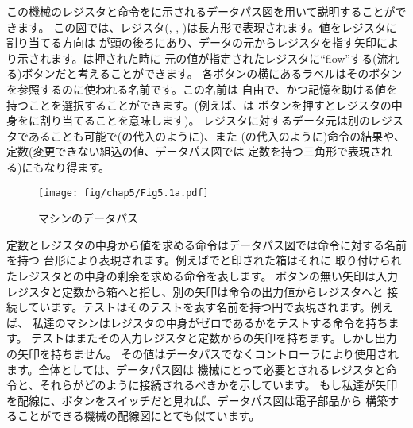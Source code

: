 この機械のレジスタと命令をに示されるデータパス図を用いて説明することができます。
この図では、レジスタ(, , )は長方形で表現されます。値をレジスタに割り当てる方向は
が頭の後ろにあり、データの元からレジスタを指す矢印により示されます。は押された時に
元の値が指定されたレジスタに``flow''する(流れる)ボタンだと考えることができます。
各ボタンの横にあるラベルはそのボタンを参照するのに使われる名前です。この名前は
自由で、かつ記憶を助ける値を持つことを選択することができます。(例えば、は
ボタンを押すとレジスタの中身をに割り当てることを意味します)。
レジスタに対するデータ元は別のレジスタであることも可能で(の代入のように)、また
(の代入のように)命令の結果や、定数(変更できない組込の値、データパス図では
定数を持つ三角形で表現される)にもなり得ます。

\begin{figure}[tb]
\label{Figure 5.1}
\centering
\begin{comment}
\heading{Figure 5.1:} Data paths for a \acronym{GCD} machine.

\begin{example}
                              ___
+-----+          +-----+     /   \
|  a  |<--(X)----|  b  +--->|  =  |
+--+--+   a<-b   +-+---+     \___/
   |               |  ^        ^
   +------+   +----+  |        |
          |   |      (X) b<-t  |
       .--+---+--.    |       / \
        \  rem  /     |      / O \
         \_____/      |     +-----+
            |         |
           (X) t<-r   |
            |         |
            V         |
         +-----+      |
         |  t  +------+
         +-----+
\end{example}
\end{comment}
\texttt{[image: fig/chap5/Fig5.1a.pdf]}
\par\bigskip
\noindent
{} マシンのデータパス
\end{figure}

\noindent
定数とレジスタの中身から値を求める命令はデータパス図では命令に対する名前を持つ
台形により表現されます。例えばでと印された箱はそれに
取り付けられたレジスタとの中身の剰余を求める命令を表します。
ボタンの無い矢印は入力レジスタと定数から箱へと指し、別の矢印は命令の出力値からレジスタへと
接続しています。テストはそのテストを表す名前を持つ円で表現されます。例えば、
私達の\acronym{GCD}マシンはレジスタ\code{b}の中身がゼロであるかをテストする命令を持ちます。
テストはまたその入力レジスタと定数からの矢印を持ちます。しかし出力の矢印を持ちません。
その値はデータパスでなくコントローラにより使用されます。全体としては、データパス図は
機械にとって必要とされるレジスタと命令と、それらがどのように接続されるべきかを示しています。
もし私達が矢印を配線に、\code{X}ボタンをスイッチだと見れば、データパス図は電子部品から
構築することができる機械の配線図にとても似ています。

